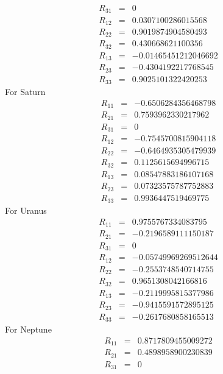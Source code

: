 {\begin{eqnarray}
   R_{31} & = &  0 \nonumber \\
   R_{12} & = &  0.0307100286015568 \nonumber \\
   R_{22} & = &  0.9019874904580493 \nonumber \\
   R_{32} & = &  0.430668621100356 \nonumber \\
   R_{13} & = &  -0.01465451212046692 \nonumber \\
   R_{23} & = &  -0.4304192217768545 \nonumber \\
   R_{33} & = &  0.9025101322420253
\end{eqnarray}
%
For Saturn
%
\begin{eqnarray}
   R_{11} & = &  -0.6506284356468798 \nonumber \\
   R_{21} & = &  0.7593962330217962 \nonumber \\
   R_{31} & = &  0 \nonumber \\
   R_{12} & = &  -0.7545700815904118 \nonumber \\
   R_{22} & = &  -0.6464935305479939 \nonumber \\
   R_{32} & = &  0.1125615694996715 \nonumber \\
   R_{13} & = &  0.08547883186107168 \nonumber \\
   R_{23} & = &  0.07323575787752883 \nonumber \\
   R_{33} & = &  0.9936447519469775
\end{eqnarray}
%
For Uranus
%
\begin{eqnarray}
   R_{11} & = &  0.9755767334083795 \nonumber \\
   R_{21} & = &  -0.2196589111150187 \nonumber \\
   R_{31} & = &  0 \nonumber \\
   R_{12} & = &  -0.05749969269512644 \nonumber \\
   R_{22} & = &  -0.2553748540714755 \nonumber \\
   R_{32} & = &  0.9651308042166816 \nonumber \\
   R_{13} & = &  -0.2119995815377986 \nonumber \\
   R_{23} & = &  -0.9415591572895125 \nonumber \\
   R_{33} & = &  -0.2617680858165513
\end{eqnarray}
%
For Neptune
%
\begin{eqnarray}
   R_{11} & = &  0.8717809455009272 \nonumber \\
   R_{21} & = &  0.4898958900230839 \nonumber \\
   R_{31} & = &  0 \nonumber \\

\end{eqnarray}}
